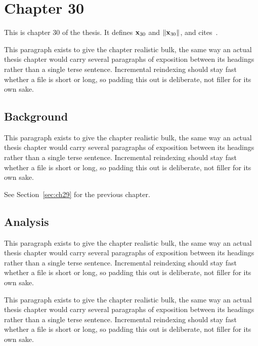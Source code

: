 \section{Chapter 30}
\label{sec:ch30}

This is chapter 30 of the thesis. It defines $\mathbf{x}_{30}$ and $\lVert \mathbf{x}_{30} \rVert$, and cites~\cite{ref1}.

This paragraph exists to give the chapter realistic bulk, the same way an actual thesis chapter would carry several paragraphs of exposition between its headings rather than a single terse sentence. Incremental reindexing should stay fast whether a file is short or long, so padding this out is deliberate, not filler for its own sake.

\subsection{Background}
\label{sec:ch30:background}

This paragraph exists to give the chapter realistic bulk, the same way an actual thesis chapter would carry several paragraphs of exposition between its headings rather than a single terse sentence. Incremental reindexing should stay fast whether a file is short or long, so padding this out is deliberate, not filler for its own sake.

See Section~\ref{sec:ch29} for the previous chapter.

\subsection{Analysis}
\label{sec:ch30:analysis}

This paragraph exists to give the chapter realistic bulk, the same way an actual thesis chapter would carry several paragraphs of exposition between its headings rather than a single terse sentence. Incremental reindexing should stay fast whether a file is short or long, so padding this out is deliberate, not filler for its own sake.

This paragraph exists to give the chapter realistic bulk, the same way an actual thesis chapter would carry several paragraphs of exposition between its headings rather than a single terse sentence. Incremental reindexing should stay fast whether a file is short or long, so padding this out is deliberate, not filler for its own sake.
